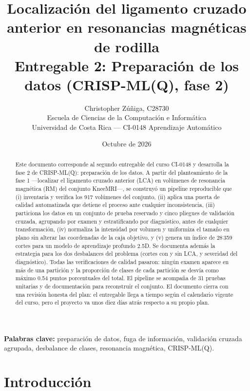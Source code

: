\documentclass[12pt,letterpaper]{article}
\title{
  Localización del ligamento cruzado anterior en resonancias magnéticas de rodilla\\[0.3em]
  \large Entregable 2: Preparación de los datos (CRISP-ML(Q), fase 2)
}
\author{Christopher Zúñiga, C28730 \\ \small Escuela de Ciencias de la Computación e Informática \\ \small Universidad de Costa Rica --- CI-0148 Aprendizaje Automático}
\date{Octubre de 2026}
\begin{document}
\maketitle

\begin{abstract}
\noindent
Este documento corresponde al segundo entregable del curso CI-0148 y desarrolla la fase 2 de CRISP-ML(Q): preparación de los datos. A partir del planteamiento de la fase 1 ---localizar el ligamento cruzado anterior (LCA) en volúmenes de resonancia magnética (RM) del conjunto KneeMRI---, se construyó un pipeline reproducible que (i) inventaria y verifica los 917 volúmenes del conjunto, (ii) aplica una puerta de calidad automatizada que detiene el proceso ante cualquier inconsistencia, (iii) particiona los datos en un conjunto de prueba reservado y cinco pliegues de validación cruzada, agrupando por examen y estratificando por diagnóstico, antes de cualquier transformación, (iv) normaliza la intensidad por volumen y uniformiza el tamaño en plano sin alterar las coordenadas de la caja objetivo, y (v) genera un índice de 28\,359 cortes para un modelo de aprendizaje profundo 2.5D. Se documenta además la estrategia para los dos desbalances del problema (cortes con y sin LCA, y severidad del diagnóstico). Todas las verificaciones de calidad pasaron: ningún examen aparece en más de una partición y la proporción de clases de cada partición se desvía como máximo 0.54 puntos porcentuales del total. El pipeline se acompaña de 31 pruebas unitarias y de documentación para reconstruir el conjunto. El documento cierra con una revisión honesta del plan: el entregable llega a tiempo según el calendario vigente del curso, pero el proyecto va unos diez días atrás respecto a su propio plan.
\end{abstract}

\vspace{0.5em}
\noindent\textbf{Palabras clave:} preparación de datos, fuga de información, validación cruzada agrupada, desbalance de clases, resonancia magnética, CRISP-ML(Q).

\vspace{1em}
\tableofcontents
\thispagestyle{fancy}

\newpage
\section{Introducción}
\end{document}
